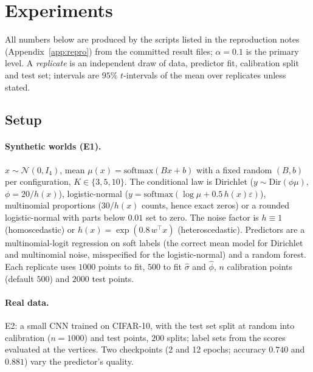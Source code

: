 \section{Experiments}\label{sec:exp}
All numbers below are produced by the scripts listed in the reproduction notes (Appendix~\ref{app:repro}) from the committed result files; $\alpha=0.1$ is the primary level. A \emph{replicate} is an independent draw of data, predictor fit, calibration split and test set; intervals are $95\%$ $t$-intervals of the mean over replicates unless stated.

\subsection{Setup}
\paragraph{Synthetic worlds (E1).} $x\sim\mathcal N(0,I_4)$, mean $\mu(x)=\mathrm{softmax}(Bx+b)$ with a fixed random $(B,b)$ per configuration, $K\in\{3,5,10\}$. The conditional law is Dirichlet ($y\sim\mathrm{Dir}(\phi\mu)$, $\phi=20/h(x)$), logistic-normal ($y=\mathrm{softmax}(\log\mu+0.5\,h(x)\varepsilon)$), multinomial proportions ($30/h(x)$ counts, hence exact zeros) or a rounded logistic-normal with parts below $0.01$ set to zero. The noise factor is $h\equiv1$ (homoscedastic) or $h(x)=\exp(0.8\,w^\top x)$ (heteroscedastic). Predictors are a multinomial-logit regression on soft labels (the correct mean model for Dirichlet and multinomial noise, misspecified for the logistic-normal) and a random forest. Each replicate uses $1000$ points to fit, $500$ to fit $\hat\sigma$ and $\hat\phi$, $n$ calibration points (default $500$) and $2000$ test points.
\paragraph{Real data.} E2: a small CNN trained on CIFAR-10, with the test set split at random into calibration ($n=1000$) and test points, $200$ splits; label sets from the scores evaluated at the vertices. Two checkpoints (2 and 12 epochs; accuracy $0.740$ and $0.881$) vary the predictor's quality.

